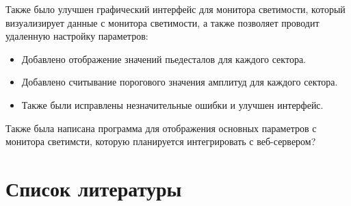 \documentclass[a4paper, 12pt]{article}
\begin{document}
    Также было улучшен графический интерфейс для монитора светимости, который визуализирует данные с монитора светимости, а также позволяет проводит удаленную настройку параметров:
    \begin{itemize} 
        \item Добавлено отображение значений пьедесталов для каждого сектора.
        \item Добавлено считывание порогового значения амплитуд для каждого сектора.
        \item Также были исправлены незначительные ошибки и улучшен интерфейс.
    \end{itemize}
    
    Также была написана программа для отображения основных параметров с монитора светимсти, которую планируется интегрировать с веб-сервером?

\section{Список литературы}
\end{document}
